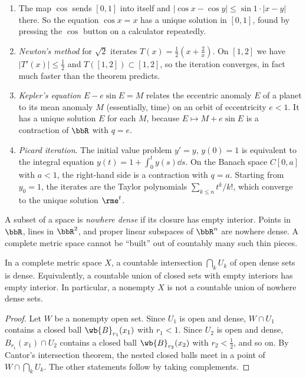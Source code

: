 \begin{example}\label{example contractions}
    \begin{enumerate}
        \item The map $\cos$ sends $[0,1]$ into itself and $\lvert\cos x-\cos y\rvert\leq\sin 1\cdot\lvert x-y\rvert$ there. So the equation $\cos x=x$ has a unique solution in $[0,1]$, found by pressing the $\cos$ button on a calculator repeatedly.
        \item \emph{Newton's method} for $\sqrt2$ iterates $T(x)=\frac12(x+\frac2x)$. On $[1,2]$ we have $\lvert T'(x)\rvert\leq\frac12$ and $T([1,2])\subset[1,2]$, so the iteration converges, in fact much faster than the theorem predicts.
        \item \emph{Kepler's equation} $E-e\sin E=M$ relates the eccentric anomaly $E$ of a planet to its mean anomaly $M$ (essentially, time) on an orbit of eccentricity $e<1$. It has a unique solution $E$ for each $M$, because $E\mapsto M+e\sin E$ is a contraction of $\bbR$ with $q=e$.
        \item \emph{Picard iteration}. The initial value problem $y'=y$, $y(0)=1$ is equivalent to the integral equation $y(t)=1+\int_0^ty(s)\dd s$. On the Banach space $C[0,a]$ with $a<1$, the right-hand side is a contraction with $q=a$. Starting from $y_0=1$, the iterates are the Taylor polynomials $\sum_{k\leq n}t^k/k!$, which converge to the unique solution $\rme^t$.
    \end{enumerate}
\end{example}

A subset of a space is \emph{nowhere dense} if its closure has empty interior. Points in $\bbR$, lines in $\bbR^2$, and proper linear subspaces of $\bbR^n$ are nowhere dense. A complete metric space cannot be ``built'' out of countably many such thin pieces.

\begin{thm}\label{thm Baire}
    In a complete metric space $X$, a countable intersection $\bigcap_kU_k$ of open dense sets is dense. Equivalently, a countable union of closed sets with empty interiors has empty interior. In particular, a nonempty $X$ is not a countable union of nowhere dense sets.
\end{thm}
\begin{proof}
    Let $W$ be a nonempty open set. Since $U_1$ is open and dense, $W\cap U_1$ contains a closed ball $\wb{B}_{r_1}(x_1)$ with $r_1<1$. Since $U_2$ is open and dense, $B_{r_1}(x_1)\cap U_2$ contains a closed ball $\wb{B}_{r_2}(x_2)$ with $r_2<\frac12$, and so on. By Cantor's intersection theorem, the nested closed balls meet in a point of $W\cap\bigcap_kU_k$. The other statements follow by taking complements.
\end{proof}

